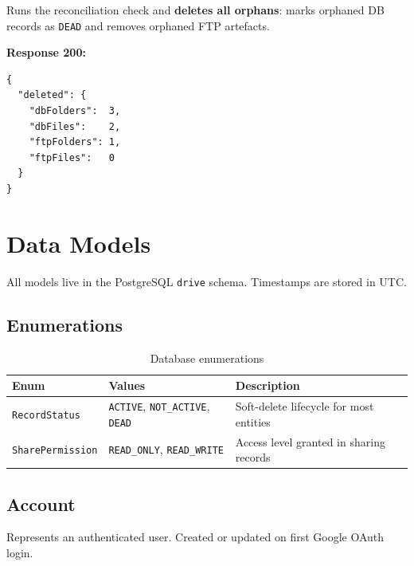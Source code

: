 \documentclass[12pt,a4paper]{article}
\begin{document}
Runs the reconciliation check and \textbf{deletes all orphans}: marks orphaned DB records as \texttt{DEAD} and removes orphaned FTP artefacts.

\textbf{Response 200:}
\begin{lstlisting}
{
  "deleted": {
    "dbFolders":  3,
    "dbFiles":    2,
    "ftpFolders": 1,
    "ftpFiles":   0
  }
}
\end{lstlisting}

\newpage

\section{Data Models}

All models live in the PostgreSQL \texttt{drive} schema. Timestamps are stored in UTC.

\subsection{Enumerations}

\begin{table}[h!]
\centering
\begin{tabularx}{\linewidth}{llX}
\toprule
\textbf{Enum} & \textbf{Values} & \textbf{Description} \\
\midrule
\texttt{RecordStatus}   & \texttt{ACTIVE}, \texttt{NOT\_ACTIVE}, \texttt{DEAD} & Soft-delete lifecycle for most entities \\
\texttt{SharePermission} & \texttt{READ\_ONLY}, \texttt{READ\_WRITE} & Access level granted in sharing records \\
\bottomrule
\end{tabularx}
\caption{Database enumerations}
\end{table}

\subsection{Account}

Represents an authenticated user. Created or updated on first Google OAuth login.
\end{document}
